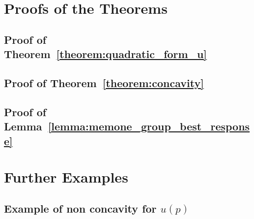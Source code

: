 


% 
% 


\section{Proofs of the Theorems}\label{section:appendix_a}

\subsection{Proof of Theorem~\ref{theorem:quadratic_form_u}}\label{appendix:proof_theorem_one}


\subsection{Proof of Theorem~\ref{theorem:concavity}}\label{appendix:proof_theorem_three}


\subsection{Proof of Lemma~\ref{lemma:memone_group_best_response}}\label{appendix:proof_lemma_four}


\section{Further Examples}\label{section:appendix_b}

\subsection{Example of non concavity for \(u(p)\) }\label{appendix:non_concave}
